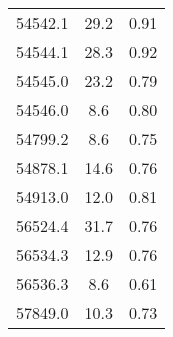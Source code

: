 \documentclass{aa}
\begin{document}
\begin{appendix}
\begin{table}[h]
\begin{tabular}{c c c}
54542.1 & 29.2 & 0.91\\
54544.1 & 28.3 & 0.92\\
54545.0 & 23.2 & 0.79\\
54546.0 &  8.6 & 0.80\\
54799.2 &  8.6 & 0.75\\
54878.1 & 14.6 & 0.76\\
54913.0 & 12.0 & 0.81\\
56524.4 & 31.7 & 0.76\\
56534.3 & 12.9 & 0.76\\
56536.3 &  8.6 & 0.61\\
57849.0 & 10.3 & 0.73\\
\hline
\end{tabular}
\end{table}

\end{appendix}
\end{document}
